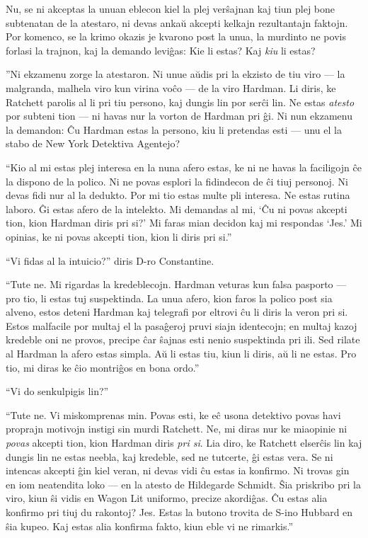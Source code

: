 Nu, se ni akceptas la unuan eblecon kiel la plej verŝajnan kaj tiun plej bone subtenatan de la atestaro, ni devas ankaŭ akcepti kelkajn rezultantajn faktojn. Por komenco, se la krimo okazis je kvarono post la unua, la murdinto ne povis forlasi la trajnon, kaj la demando leviĝas: Kie li estas? Kaj \emph{kiu} li estas?

''Ni ekzamenu zorge la atestaron. Ni unue aŭdis pri la ekzisto de tiu viro --- la malgranda, malhela viro kun virina voĉo --- de la viro Hardman. Li diris, ke Ratchett parolis al li pri tiu persono, kaj dungis lin por serĉi lin. Ne estas \emph{atesto} por subteni tion --- ni havas nur la vorton de Hardman pri ĝi. Ni nun ekzamenu la demandon: Ĉu Hardman estas la persono, kiu li pretendas esti --- unu el la stabo de New York Detektiva Agentejo?

``Kio al mi estas plej interesa en la nuna afero estas, ke ni ne havas la faciligojn ĉe la dispono de la polico. Ni ne povas esplori la fidindecon de ĉi tiuj personoj. Ni devas fidi nur al la dedukto. Por mi tio estas multe pli interesa. Ne estas rutina laboro. Ĝi estas afero de la intelekto. Mi demandas al mi, `Ĉu ni povas akcepti tion, kion Hardman diris pri si?' Mi faras mian decidon kaj mi respondas `Jes.' Mi opinias, ke ni povas akcepti tion, kion li diris pri si.''

``Vi fidas al la intuicio?'' diris D-ro Constantine.

``Tute ne. Mi rigardas la kredeblecojn. Hardman veturas kun falsa pasporto --- pro tio, li estas tuj suspektinda. La unua afero, kion faros la polico post sia alveno, estos deteni Hardman kaj telegrafi por eltrovi ĉu li diris la veron pri si. Estos malfacile por multaj el la pasaĝeroj pruvi siajn identecojn; en multaj kazoj kredeble oni ne provos, precipe ĉar ŝajnas esti nenio suspektinda pri ili. Sed rilate al Hardman la afero estas simpla. Aŭ li estas tiu, kiun li diris, aŭ li ne estas. Pro tio, mi diras ke ĉio montriĝos en bona ordo.''

``Vi do senkulpigis lin?''

``Tute ne. Vi miskomprenas min. Povas esti, ke eĉ usona detektivo povas havi proprajn motivojn instigi sin murdi Ratchett. Ne, mi diras nur ke miaopinie ni \emph{povas} akcepti tion, kion Hardman diris \emph{pri si}. Lia diro, ke Ratchett elserĉis lin kaj dungis lin ne estas neebla, kaj kredeble, sed ne tutcerte, ĝi estas vera. Se ni intencas akcepti ĝin kiel veran, ni devas vidi ĉu estas ia konfirmo. Ni trovas gin en iom neatendita loko --- en la atesto de Hildegarde Schmidt. Ŝia priskribo pri la viro, kiun ŝi vidis en Wagon Lit uniformo, precize akordiĝas. Ĉu estas alia konfirmo pri tiuj du rakontoj? Jes. Estas la butono trovita de S-ino Hubbard en ŝia kupeo. Kaj estas alia konfirma fakto, kiun eble vi ne rimarkis.''

